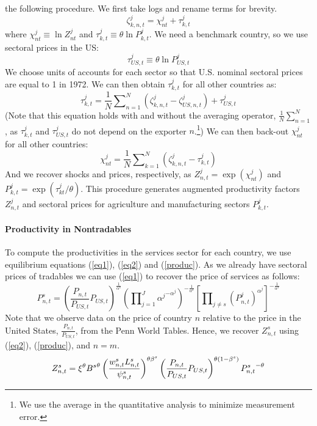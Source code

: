 \documentclass[12pt]{article}
\begin{document}
the following procedure. We first take logs and rename terms for brevity. 
\begin{equation}
\zeta _{k,n,t}^{j}=\chi _{nt}^{j}+\tau _{k,t}^{j}
\end{equation}%
where $\chi _{nt}^{j}\equiv \ln {Z_{nt}^{j}}$ and $\tau _{k,t}^{j}\equiv
\theta \ln {P_{k,t}^{j}}$. We need a benchmark country, so we use sectoral
prices in the US: 
\begin{equation*}
\tau _{US,t}^{j}\equiv \theta \ln {P_{US,t}^{j}}
\end{equation*}%
We choose units of accounts for each sector so that U.S. nominal sectoral
prices are equal to 1 in 1972. We can then obtain $\tau _{k,t}^{j}$ for all
other countries as: 
\begin{equation}
\tau _{k,t}^{j}=\frac{1}{N}\sum\nolimits_{n=1}^{N}\left( \zeta
_{k,n,t}^{j}-\zeta _{US,n,t}^{j}\right) +\tau _{US,t}^{j}
\end{equation}%
(Note that this equation holds with and without the averaging operator, $%
\frac{1}{N}\sum_{n=1}^{N}$, as $\tau _{k,t}^{j}$ and $\tau _{US,t}^{j}$ do
not depend on the exporter $n$.\footnote{%
We use the average in the quantitative analysis to minimize measurement
error.}) We can then back-out $\chi _{nt}^{j}$ for all other countries:%
\begin{equation}
\chi _{nt}^{j}=\frac{1}{N}\sum\nolimits_{k=1}^{N}\left( \zeta
_{k,n,t}^{j}-\tau _{k,t}^{j}\right) 
\end{equation}%
And we recover shocks and prices, respectively, as $Z_{n,t}^{j}=\exp \left(
\chi _{nt}^{j}\right) $ and $P_{k,t}^{j}=\exp \left( \tau _{kt}^{j}/\theta
\right) .$ This procedure generates augmented productivity factors $%
Z_{n,t}^{j}$ and sectoral prices for agriculture and manufacturing sectors $%
P_{k,t}^{j}$.

\paragraph{Productivity in Nontradables}

To compute the productivities in the services sector for each country, we
use equilibrium equations (\ref{eq1}), (\ref{eq2}) and (\ref{produc}). As we
already have sectoral prices of tradables we can use (\ref{eq1}) to recover
the price of services as follows: 
\begin{equation}
P_{n,t}^{s}=\left( \frac{P_{n,t}}{P_{US,t}}P_{US,t}\right) ^{\frac{1}{\alpha
^{s}}}\left( \prod\nolimits_{j=1}^{J}{\alpha ^{j}}^{-\alpha ^{j}}\right) ^{-%
\frac{1}{\alpha ^{s}}}\left[ \prod\nolimits_{j\neq s}\left(
P_{n,t}^{j}\right) ^{\alpha ^{j}}\right] ^{-\frac{1}{\alpha ^{s}}}
\end{equation}%
Note that we observe data on the price of country $n$ relative to the price
in the United States, $\frac{P_{n,t}}{P_{US,t}}$, from the Penn World
Tables. Hence, we recover $Z_{n,t}^{s}$ using (\ref{eq2}), (\ref{produc}),
and $n=m$. 
\begin{equation}
Z_{n,t}^{s}=\xi ^{\theta }{B^{s}}^{\theta }\left( \frac{%
w_{n,t}^{s}L_{n,t}^{s}}{\psi _{n,t}^{s}}\right) ^{\theta \beta ^{s}}\left( 
\frac{P_{n,t}}{P_{US,t}}P_{US,t}\right) ^{\theta (1-\beta ^{s})}{P_{n,t}^{s}}%
^{-\theta }
\end{equation}
\end{document}
